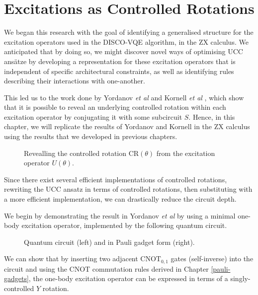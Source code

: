 \section{Excitations as Controlled Rotations}%
\label{operator-controlled-rotations}

We began this research with the goal of identifying a generalised structure for the excitation operators used in the DISCO-VQE algorithm, in the ZX calculus. We anticipated that by doing so, we might discover novel ways of optimising UCC ansätze by developing a representation for these excitation operators that is independent of specific architectural constraints, as well as identifying rules describing their interactions with one-another.

This led us to the work done by Yordanov \textit{et al} \cite{Yordanov2020} and Kornell \textit{et al} \cite{Kornell2023}, which show that it is possible to reveal an underlying controlled rotation within each excitation operator by conjugating it with some subcircuit $S$. Hence, in this chapter, we will replicate the results of Yordanov and Kornell in the ZX calculus using the results that we developed in previous chapters.

\begin{figure}[H]
    \centering
    \caption{Revealling the controlled rotation CR$(\theta)$ from the excitation operator $U(\theta)$.}
\end{figure}

Since there exist several efficient implementations of controlled rotations, rewriting the UCC ansatz in terms of controlled rotations, then substituting with a more efficient implementation, we can drastically reduce the circuit depth.

We begin by demonstrating the result in Yordanov \textit{et al} by using a minimal one-body excitation operator, implemented by the following quantum circuit.

\begin{figure}[H]
    \centering
    \caption{Quantum circuit (left) and in Pauli gadget form (right).}
\end{figure}

We can show that by inserting two adjacent $\text{CNOT}_{0, 1}$ gates (self-inverse) into the circuit and using the CNOT commutation rules derived in Chapter \ref{pauli-gadgets}, the one-body excitation operator can be expressed in terms of a singly-controlled $Y$ rotation.

